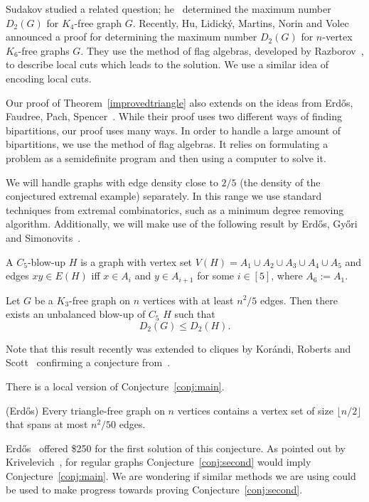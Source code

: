 \documentclass{svproc}
\begin{document}
Sudakov studied a related question; he~\cite{MR2359832} determined the maximum number $D_2(G)$ for $K_4$-free graph $G$. Recently, Hu, Lidick\'{y}, Martins, Norin and Volec~\cite{hulimanovo} announced a proof for determining the maximum number $D_2(G)$ for $n$-vertex $K_6$-free graphs $G$.
They use the method of flag algebras, developed by Razborov~\cite{flagsRaz}, to describe local cuts which leads to the solution. We use a similar idea of encoding local cuts.

Our proof of Theorem~\ref{improvedtriangle} also extends on the ideas from Erd\H{o}s, Faudree, Pach, Spencer~\cite{Howtotriangle}. While their proof uses two different ways of finding bipartitions, our proof uses many ways. In order to handle a large amount of bipartitions, we use the method of flag algebras. It relies on formulating a problem as a semidefinite program and then using a computer to solve it.

We will handle graphs with edge density close to $2/5$ (the density of the conjectured extremal example) separately. In this range we use standard techniques from extremal combinatorics, such as a minimum degree removing algorithm. Additionally, we will make use of the following result by Erd\H{o}s, Gy\H{o}ri and Simonovits~\cite{Howmany}.

A $C_5$-blow-up $H$ is a graph with vertex set $V(H)=A_1 \cup A_2 \cup A_3 \cup A_4 \cup A_5$ and edges $xy\in E(H)$ iff $x\in A_i$ and $y\in A_{i+1}$ for some $i\in [5]$, where $A_6:=A_1$. 
\begin{theorem} 
\label{ErdosC_5blowup}
Let $G$ be a $K_3$-free graph on $n$ vertices with at least $n^2/5$ edges. Then there exists an unbalanced blow-up of $C_5$ $H$ such that   
\begin{equation}
D_2(G)\leq D_2(H).
\end{equation} 
\end{theorem}
Note that this result recently was extended to cliques by Kor\'andi, Roberts and Scott~\cite{scott} confirming a conjecture from~\cite{Makingrpartite}.

There is a local version of Conjecture~\ref{conj:main}.
\begin{conjecture}{(Erd\H{o}s\cite{MR0409246})}
\label{conj:second}
Every triangle-free graph on $n$ vertices contains a vertex set of size $\lfloor n/2 \rfloor$ that spans at most $n^2/50$ edges.
\end{conjecture}
Erd\H{o}s~\cite{MR1439273} offered \$250 for the first solution of this conjecture. As pointed out by Krivelevich~\cite{MR1320169}, for regular graphs Conjecture~\ref{conj:second} would imply Conjecture~\ref{conj:main}. We are wondering if similar methods we are using could be used to make progress towards proving Conjecture~\ref{conj:second}.
\end{document}
